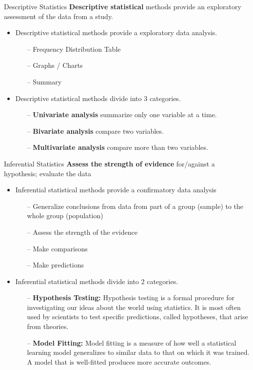 \documentclass[10pt,dvipsnames, aspectratio=169]{beamer}
\begin{document}
\begin{frame}[t]{Descriptive Statistics}
	\textbf{Descriptive statistical} methods provide an exploratory assessment 
	of the data from a study. 
	\begin{itemize}
		\item Descriptive statistical methods provide a exploratory data 
		analysis.
		\begin{itemize}
			\item[--] Frequency Distribution Table 
			\item[--] Graphs / Charts 
			\item [--] Summary 
		\end{itemize}
		\item Descriptive statistical methods divide into 3 categories.
		\begin{itemize}
			\item[--] \textbf{Univariate analysis} summarize only one variable 
			at a 
			time.
			\item[--] \textbf{Bivariate analysis}  compare two variables.
			\item [--]\textbf{Multivariate analysis} compare more than two 
			variables.
		\end{itemize}
	\end{itemize}
\end{frame}

\begin{frame}[t]{Inferential Statistics}
	\textbf{Assess the strength of evidence} for/against a hypothesis; evaluate 
	the data
	\begin{itemize}
		\item Inferential statistical methods provide a confirmatory data 
		analysis
		\begin{itemize}
			\item [--]Generalize conclusions from data from part of a group 
			(sample) to the whole group
			(population)
			\item[--] Assess the strength of the evidence
			\item [--]Make comparisons
			\item [--]Make predictions
		\end{itemize}
		\item Inferential statistical methods divide into 2 categories.
		\begin{itemize}
			\item[--] \textbf{ Hypothesis Testing:} Hypothesis testing is a 
			formal 
			procedure for investigating our ideas about the world using 
			statistics. 
			It is most often used by scientists to test specific predictions, 
			called hypotheses, that arise from theories.
			\item[--] \textbf{Model Fitting:} Model fitting is a measure of how 
			well a statistical learning model generalizes to similar data to 
			that 
			on which it was trained. A model that is well-fitted produces more 
			accurate outcomes.
		\end{itemize}
	\end{itemize}
\end{frame}
\end{document}
